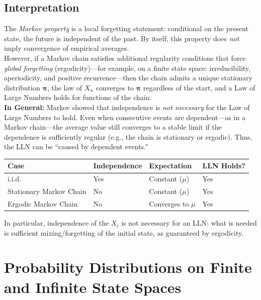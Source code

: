 \subsection{Interpretation }

The \emph{Markov property} is a local forgetting statement: conditional on the
present state, the future is independent of the past. By itself, this property
does \emph{not} imply convergence of empirical averages.\\ 

However, if a Markov chain satisfies additional regularity conditions that
force \emph{global forgetting} (ergodicity)—for example, on a finite state space:
irreducibility, aperiodicity, and positive recurrence—then the chain admits a
unique stationary distribution $\boldsymbol{\pi}$, the law of $X_n$ converges to
$\boldsymbol{\pi}$ regardless of the start, and a Law of Large Numbers holds
for functions of the chain.\\

\textbf{In General:} Markov showed that independence is \emph{not necessary} for the Law of Large Numbers
to hold.  Even when consecutive events are dependent---as in a Markov chain---the
average value still converges to a stable limit if the dependence is sufficiently
regular (e.g., the chain is stationary or ergodic).  Thus, the LLN can be
``caused by dependent events.''

\begin{center}
\begin{tabular}{llll}
\toprule
\textbf{Case} & \textbf{Independence} & \textbf{Expectation} & \textbf{LLN Holds?} \\
\midrule
i.i.d. & Yes & Constant ($\mu$) & Yes \\
Stationary Markov Chain & No & Constant ($\mu$) & Yes \\
Ergodic Markov Chain & No & Converges to $\mu$ & Yes \\
\bottomrule
\end{tabular}
\end{center}


\noindent
In particular, independence of the $X_i$ is not necessary for an LLN:
what is needed is sufficient mixing/forgetting of the initial state, as
guaranteed by ergodicity.




\section{Probability Distributions on Finite and Infinite State Spaces}

